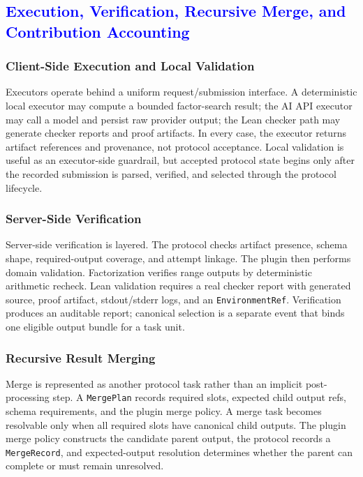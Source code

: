 \documentclass{article}
\theoremstyle{plain}
\begin{document}
\subsection{\textcolor{blue}{Execution, Verification, Recursive Merge, and Contribution Accounting}}

\subsubsection{Client-Side Execution and Local Validation}

{\color{blue}
Executors operate behind a uniform request/submission interface. A deterministic local executor may compute a bounded factor-search result; the AI API executor may call a model and persist raw provider output; the Lean checker path may generate checker reports and proof artifacts. In every case, the executor returns artifact references and provenance, not protocol acceptance. Local validation is useful as an executor-side guardrail, but accepted protocol state begins only after the recorded submission is parsed, verified, and selected through the protocol lifecycle.
}

\subsubsection{Server-Side Verification}

{\color{blue}
Server-side verification is layered. The protocol checks artifact presence, schema shape, required-output coverage, and attempt linkage. The plugin then performs domain validation. Factorization verifies range outputs by deterministic arithmetic recheck. Lean validation requires a real checker report with generated source, proof artifact, stdout/stderr logs, and an \texttt{EnvironmentRef}. Verification produces an auditable report; canonical selection is a separate event that binds one eligible output bundle for a task unit.
}

\subsubsection{Recursive Result Merging}

{\color{blue}
Merge is represented as another protocol task rather than an implicit post-processing step. A \texttt{MergePlan} records required slots, expected child output refs, schema requirements, and the plugin merge policy. A merge task becomes resolvable only when all required slots have canonical child outputs. The plugin merge policy constructs the candidate parent output, the protocol records a \texttt{MergeRecord}, and expected-output resolution determines whether the parent can complete or must remain unresolved.
}
\end{document}
